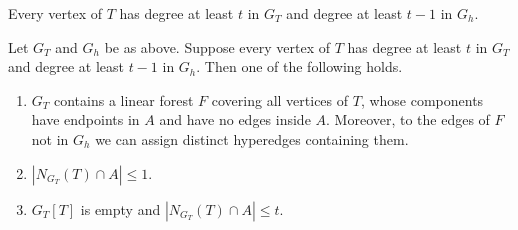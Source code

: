 \documentclass[10pt,a4paper]{amsart}
\begin{document}
\begin{lemma}\label{lem:heavy-degree}
Every vertex of $T$ has degree at least $t$ in $G_T$ and degree at least
$t-1$ in $G_h$.
\end{lemma}

\begin{lemma}\label{lem:shadow}
Let $G_T$ and $G_h$ be as above.  Suppose every vertex of $T$ has degree
at least $t$ in $G_T$ and degree at least $t-1$ in $G_h$.  Then one of the
following holds.
\begin{enumerate}[label=(\roman*)]
\item $G_T$ contains a linear forest $F$ covering all vertices of $T$,
whose components have endpoints in $A$ and have no edges inside $A$.
Moreover, to the edges of $F$ not in $G_h$ 
we can assign distinct hyperedges containing them.
\item $|N_{G_T}(T)\cap A|\le 1$.
\item $G_T[T]$ is empty and $|N_{G_T}(T)\cap A|\le t$.
\end{enumerate}
\end{lemma}
\end{document}
